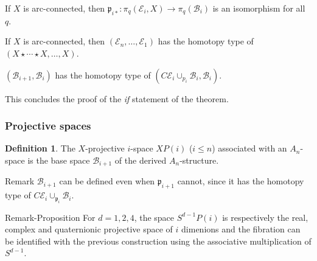 \documentclass{beamer}
\theoremstyle{definition}
\newtheorem{defi}{Definition}
\begin{document}
\begin{frame}
\begin{theorem}
If $X$ is arc-connected, then $\mathfrak{p}_{i*}:\pi_q(\mathcal{E}_i,X)\to \pi_q(\mathcal{B}_i)$ is an isomorphism for all $q$. %
\end{theorem}\pause

\begin{theorem}
If $X$ is arc-connected, then $(\mathcal{E}_n, \dots, \mathcal{E}_1)$ has the homotopy type of $(X\star\cdots\star X,\dots, X)$. %
\end{theorem}\pause

\begin{theorem}
$(\mathcal{B}_{i+1},\mathcal{B}_i)$ has the homotopy type of $(C\mathcal{E}_i\cup_{p_i}\mathcal{B}_i,\mathcal{B}_i)$. %
\end{theorem}\pause
This concludes the proof of the \emph{if} statement of the theorem.
\end{frame}
\begin{frame}
\frametitle{Projective spaces}
\begin{defi}
The $X$-projective $i$-space $XP(i)$ ($i\leq n$) associated with an $A_n$-space is the base space $\mathcal{B}_{i+1}$ of the derived $A_n$-structure.
\end{defi}\pause
\begin{block}{Remark}
$\mathcal{B}_{i+1}$ can be defined even when $\mathfrak{p}_{i+1}$ cannot, since it has the homotopy type of $C\mathcal{E}_i\cup_{\mathfrak{p}_i}\mathcal{B}_i$.
\end{block}\pause
\begin{block}{Remark-Proposition}%
For $d=1,2,4$, the space $S^{d-1}P(i)$ is respectively the real, complex and quaternionic projective space of $i$ dimenions and the fibration can be identified with the previous construction using the associative multiplication of $S^{d-1}$.
\end{block}
\end{frame}
\end{document}
